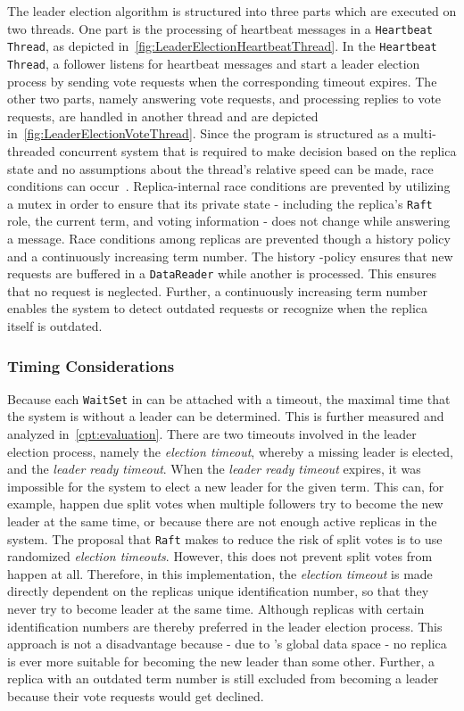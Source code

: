 The leader election algorithm is structured into three parts which are executed on two  threads.
One part is the processing of heartbeat messages in a \texttt{Heartbeat Thread}, as depicted in~\autoref{fig:LeaderElectionHeartbeatThread}.
In the \texttt{Heartbeat Thread}, a follower listens for heartbeat messages and start a leader election process by sending vote requests when the corresponding timeout expires.
The other two parts, namely answering vote requests, and processing replies to vote requests, are handled in another thread and are depicted in~\autoref{fig:LeaderElectionVoteThread}.
Since the program is structured as a multi-threaded concurrent system that is required to make decision based on the replica state and no assumptions about the thread's relative speed can be made, race conditions can occur~\cite{Dijkstra1965}.
Replica-internal race conditions are prevented by utilizing a mutex in order to ensure that its private state - including the replica's \texttt{Raft} role, the current term, and voting information - does not change while answering a message.
Race conditions among replicas are prevented though a history  policy and a continuously increasing term number.
The history -policy ensures that new requests are buffered in a \texttt{DataReader} while another is processed.
This ensures that no request is neglected.
Further, a continuously increasing term number enables the system to detect outdated requests or recognize when the replica itself is outdated.

\subsubsection{Timing Considerations}
\label{subsub:timeConsiderations}
Because each \texttt{WaitSet} in  can be attached with a timeout, the maximal time that the system is without a leader can be determined.
This is further measured and analyzed in~\autoref{cpt:evaluation}.
There are two timeouts involved in the leader election process, namely the \textit{election timeout}, whereby a missing leader is elected, and the \textit{leader ready timeout}.
When the \textit{leader ready timeout} expires, it was impossible for the system to elect a new leader for the given term.
This can, for example, happen due split votes when multiple followers try to become the new leader at the same time, or because there are not enough active replicas in the system.
The proposal that \texttt{Raft} makes to reduce the risk of split votes is to use randomized \textit{election timeouts}.
However, this does not prevent split votes from happen at all.
Therefore, in this implementation, the \textit{election timeout} is made directly dependent on the replicas unique identification number, so that they never try to become leader at the same time.
Although replicas with certain identification numbers are thereby preferred in the leader election process.
This approach is not a disadvantage because - due to 's global data space - no replica is ever more suitable for becoming the new leader than some other.
Further, a replica with an outdated term number is still excluded from becoming a leader because their vote requests would get declined.


